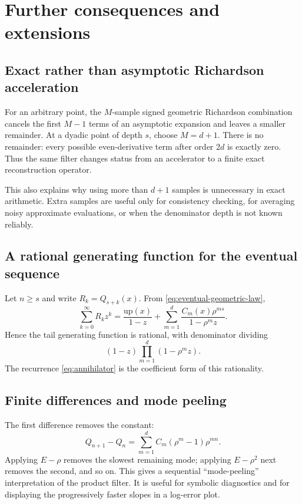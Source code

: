\documentclass[11pt,oneside]{article}
\numberwithin{equation}{section}
\theoremstyle{definition}
\theoremstyle{remark}
\newcommand{\upf}{\mathrm{up}}
\begin{document}
\section{Further consequences and extensions}

\subsection{Exact rather than asymptotic Richardson acceleration}

For an arbitrary point, the $M$-sample signed geometric Richardson combination
cancels the first $M-1$ terms of an asymptotic expansion and leaves a smaller
remainder.  At a dyadic point of depth $s$, choose $M=d+1$.  There is no
remainder: every possible even-derivative term after order $2d$ is exactly zero.
Thus the same filter changes status from an accelerator to a finite exact
reconstruction operator.

This also explains why using more than $d+1$ samples is unnecessary in exact
arithmetic.  Extra samples are useful only for consistency checking, for
averaging noisy approximate evaluations, or when the denominator depth is not
known reliably.

\subsection{A rational generating function for the eventual sequence}

Let $n\ge s$ and write $R_k=Q_{s+k}(x)$.  From
\eqref{eq:eventual-geometric-law},
\begin{equation}
 \sum_{k=0}^{\infty}R_kz^k
 =\frac{\upf(x)}{1-z}
 +\sum_{m=1}^{d}\frac{C_m(x)\rho^{ms}}{1-\rho^mz}.
 \label{eq:eventual-generating-function}
\end{equation}
Hence the tail generating function is rational, with denominator dividing
\begin{equation}
 (1-z)\prod_{m=1}^{d}(1-\rho^mz).
 \label{eq:generating-denominator}
\end{equation}
The recurrence \eqref{eq:annihilator} is the coefficient form of this rationality.

\subsection{Finite differences and mode peeling}

The first difference removes the constant:
\begin{equation}
 Q_{n+1}-Q_n
 =\sum_{m=1}^{d}C_m(\rho^m-1)\rho^{mn}.
 \label{eq:first-difference}
\end{equation}
Applying $E-\rho$ removes the slowest remaining mode; applying
$E-\rho^2$ next removes the second, and so on.  This gives a sequential
``mode-peeling'' interpretation of the product filter.  It is useful for
symbolic diagnostics and for displaying the progressively faster slopes in a
log-error plot.
\end{document}
